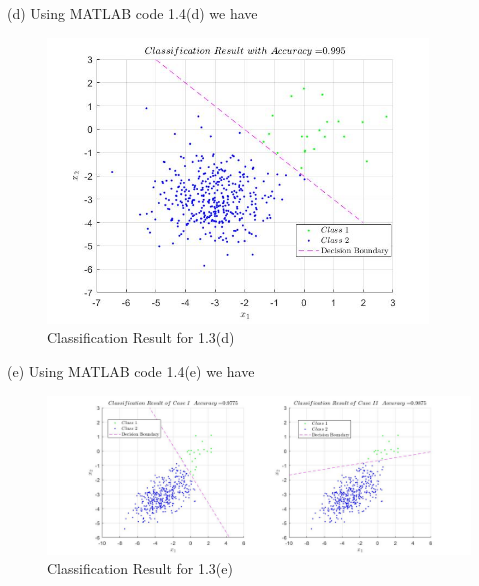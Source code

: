 \documentclass[12pt]{article}
\begin{document}
\vfill
\clearpage


\noindent(d) Using MATLAB code 1.4(d) we have

\begin{figure}[H]
\centering
\includegraphics[width=0.9\textwidth]{14d.jpg}
\caption{\label{14d}Classification Result for 1.3(d)}
\end{figure}


\noindent(e) Using MATLAB code 1.4(e) we have

\begin{figure}[H]
\centering
\includegraphics[width=1\textwidth]{14e.jpg}
\caption{\label{14e}Classification Result for 1.3(e)}
\end{figure}



\vfill
\clearpage
\end{document}
